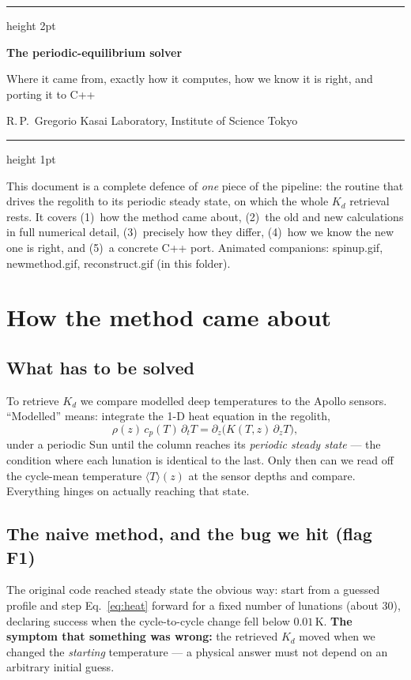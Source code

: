\documentclass[11pt]{article}
\newcommand{\Tm}{\langle T\rangle}
\newcommand{\code}[1]{{\ttfamily\small #1}}
\begin{document}
\thispagestyle{empty}
\begingroup\color{forest}\hrule height 2pt\endgroup
\vspace{8pt}
{\sffamily\bfseries\LARGE The periodic-equilibrium solver\par}
\vspace{3pt}
{\sffamily\large\color{dim} Where it came from, exactly how it computes, how we
know it is right, and porting it to C++\par}
\vspace{5pt}
{\color{char} R.\,P.\ Gregorio \quad\textbullet\quad Kasai Laboratory, Institute of Science Tokyo}
\vspace{6pt}
\begingroup\color{rulec}\hrule height 1pt\endgroup
\vspace{9pt}

\noindent This document is a complete defence of \emph{one} piece of the
pipeline: the routine that drives the regolith to its periodic steady state, on
which the whole $K_d$ retrieval rests. It covers (1)~how the method came about,
(2)~the old and new calculations in full numerical detail, (3)~precisely how
they differ, (4)~how we know the new one is right, and (5)~a concrete C++ port.
Animated companions: \code{spinup.gif}, \code{newmethod.gif},
\code{reconstruct.gif} (in this folder).

\section{How the method came about}
\subsection{What has to be solved}
To retrieve $K_d$ we compare modelled deep temperatures to the Apollo sensors.
``Modelled'' means: integrate the 1-D heat equation in the regolith,
\begin{equation}
\rho(z)\,c_p(T)\,\partial_t T = \partial_z\!\bigl(K(T,z)\,\partial_z T\bigr),
\label{eq:heat}
\end{equation}
under a periodic Sun until the column reaches its \emph{periodic steady state}
--- the condition where each lunation is identical to the last. Only then can we
read off the cycle-mean temperature $\Tm(z)$ at the sensor depths and compare.
Everything hinges on actually reaching that state.

\subsection{The naive method, and the bug we hit (flag F1)}
The original code reached steady state the obvious way: start from a guessed
profile and step Eq.~\eqref{eq:heat} forward for a fixed number of lunations
(about 30), declaring success when the cycle-to-cycle change fell below
$0.01$\,K. \textbf{The symptom that something was wrong:} the retrieved $K_d$
moved when we changed the \emph{starting} temperature --- a physical answer must
not depend on an arbitrary initial guess.
\end{document}
